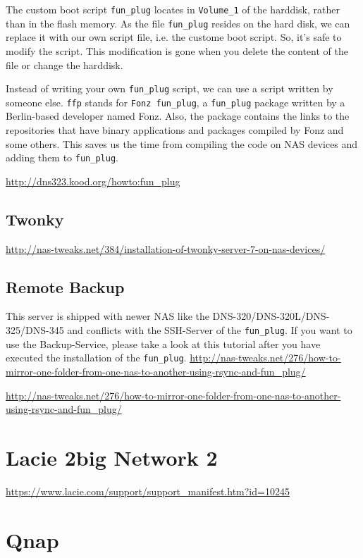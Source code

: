 The custom boot script \verb!fun_plug! locates in \verb!Volume_1! of the
harddisk, rather than in the flash memory. As the file \verb!fun_plug! resides
on the hard disk, we can replace it with our own script file, i.e. the custome
boot script. So, it's safe to modify the script. This modification is gone when
you delete the content of the file or change the harddisk.

Instead of writing your own \verb!fun_plug! script, we can use a script written
by someone else. \verb!ffp! stands for \verb!Fonz fun_plug!, a \verb!fun_plug!
package written by a Berlin-based developer named Fonz.
Also, the package contains the links to the repositories that have binary
applications and packages compiled by Fonz and some others. This saves
us the time from compiling the code on NAS devices and adding them to
\verb!fun_plug!. 


\url{http://dns323.kood.org/howto:fun_plug}


\subsection{Twonky}


\url{http://nas-tweaks.net/384/installation-of-twonky-server-7-on-nas-devices/}

\subsection{Remote Backup}
\label{sec:DNS_remote-backup}

This server is shipped with newer NAS like the DNS-320/DNS-320L/DNS-325/DNS-345
and conflicts with the SSH-Server of the \verb!fun_plug!. If you want to use the
Backup-Service, please take a look at this tutorial after you have executed the
installation of the \verb!fun_plug!.
\url{http://nas-tweaks.net/276/how-to-mirror-one-folder-from-one-nas-to-another-using-rsync-and-fun_plug/}


\url{http://nas-tweaks.net/276/how-to-mirror-one-folder-from-one-nas-to-another-using-rsync-and-fun_plug/}


\section{Lacie 2big Network 2}

\url{https://www.lacie.com/support/support_manifest.htm?id=10245}

\section{Qnap}
\label{sec:QNAP}

